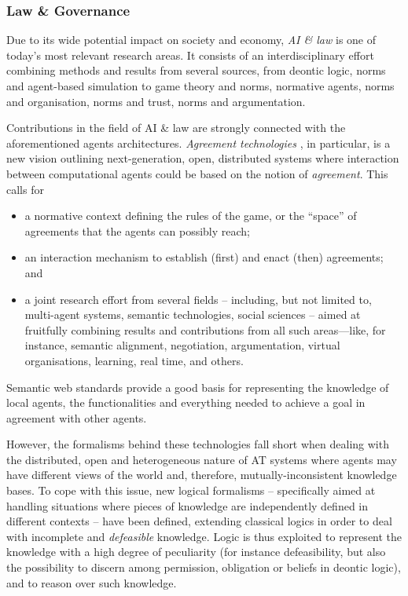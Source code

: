 \documentclass[12pt,a4paper,openright,twoside]{book}
\begin{document}
\subsubsection{Law \& Governance}\label{sssec:ai-and-law}

Due to its wide potential impact on society and economy, \emph{AI \& law} is one of today's most relevant research areas.
%
It consists of an interdisciplinary effort combining methods and results from several sources, from deontic logic, norms and agent-based simulation to game theory and norms, normative agents, norms and organisation, norms and trust, norms and argumentation.

Contributions in the field of AI \& law are strongly connected with the aforementioned agents architectures.
%
\emph{Agreement technologies} \cite{ossowski2012}, in particular, is a new vision outlining next-generation, open, distributed systems where interaction between computational agents could be  based on the notion of \emph{agreement}.
%
This calls for
%
\begin{itemize}
    \item a normative context defining the rules of the game, or the ``space'' of agreements that the agents can possibly reach;
    \item an interaction mechanism to establish (first) and enact (then) agreements; and
    \item a joint research effort from several fields -- including, but not limited to, multi-agent systems, semantic technologies, social sciences -- aimed at fruitfully combining results and contributions from all such areas---like, for instance, semantic alignment, negotiation, argumentation, virtual organisations, learning, real time, and others.
\end{itemize}
%
Semantic web standards provide a good basis for representing the knowledge of local agents, the functionalities and everything needed to achieve a goal in agreement with other agents.

However, the formalisms behind these technologies fall short when dealing with the distributed, open and heterogeneous nature of AT systems where agents may have different views of the world and, therefore, mutually-inconsistent knowledge bases.
%
To cope with this issue, new logical formalisms -- specifically aimed at handling situations where pieces of knowledge are independently defined in different contexts -- have been defined, extending classical logics in order to deal with incomplete and \emph{defeasible} knowledge.
%
Logic is thus exploited to represent the knowledge with a high degree of peculiarity (for instance defeasibility, but also the possibility to discern among permission, obligation or beliefs in deontic logic), and to reason over such knowledge.
\end{document}
